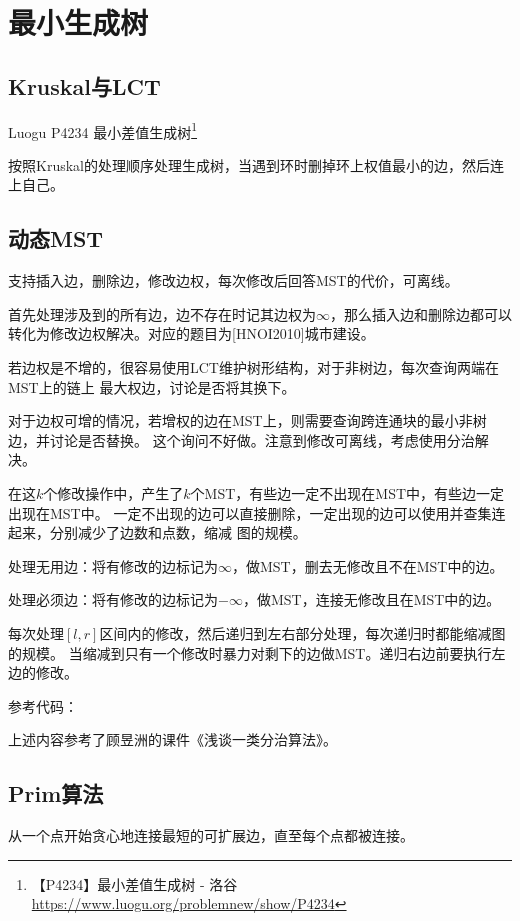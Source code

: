 \section{最小生成树}
\subsection{Kruskal与LCT}
Luogu P4234 最小差值生成树\footnote{【P4234】最小差值生成树 - 洛谷
	\url{https://www.luogu.org/problemnew/show/P4234}
}

按照Kruskal的处理顺序处理生成树，当遇到环时删掉环上权值最小的边，然后连上自己。

\subsection{动态MST}
支持插入边，删除边，修改边权，每次修改后回答MST的代价，可离线。

首先处理涉及到的所有边，边不存在时记其边权为$\infty$，那么插入边和删除边都可以
转化为修改边权解决。对应的题目为[HNOI2010]城市建设。

若边权是不增的，很容易使用LCT维护树形结构，对于非树边，每次查询两端在MST上的链上
最大权边，讨论是否将其换下。

对于边权可增的情况，若增权的边在MST上，则需要查询跨连通块的最小非树边，并讨论是否替换。
这个询问不好做。注意到修改可离线，考虑使用分治解决。

在这$k$个修改操作中，产生了$k$个MST，有些边一定不出现在MST中，有些边一定出现在MST中。
一定不出现的边可以直接删除，一定出现的边可以使用并查集连起来，分别减少了边数和点数，缩减
图的规模。

处理无用边：将有修改的边标记为$\infty$，做MST，删去无修改且不在MST中的边。

处理必须边：将有修改的边标记为$-\infty$，做MST，连接无修改且在MST中的边。

每次处理$[l,r]$区间内的修改，然后递归到左右部分处理，每次递归时都能缩减图的规模。
当缩减到只有一个修改时暴力对剩下的边做MST。递归右边前要执行左边的修改。

参考代码：


上述内容参考了顾昱洲的课件《浅谈一类分治算法》。
\subsection{Prim算法}

从一个点开始贪心地连接最短的可扩展边，直至每个点都被连接。

